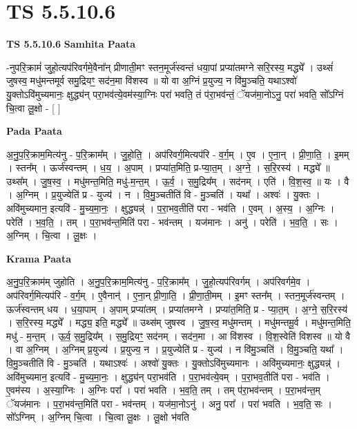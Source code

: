 \documentclass[17pt]{extarticle}
\begin{document}
\section{ TS 5.5.10.6 }

\textbf{TS 5.5.10.6 } \newline
\textbf{Samhita Paata} \newline

-नुपरि॒क्रामं॑ जुहो॒त्यप॑रिवर्गमे॒वैना᳚न् प्रीणाती॒मꣳ स्तन॒मूर्ज॑स्वन्तं धया॒पां प्रप्या॑तमग्ने सरि॒रस्य॒ मद्ध्ये᳚ । उथ्सं॑ जुषस्व॒ मधु॑मन्तमूर्व समु॒द्रियꣳ॒॒ सद॑न॒मा वि॑शस्व ॥ यो वा अ॒ग्निं प्र॒युज्य॒ न वि॑मु॒ञ्चति॒ यथाऽश्वो॑ यु॒क्तोऽवि॑मुच्यमानः॒ क्षुद्ध्य॑न् परा॒भव॑त्ये॒वम॑स्या॒ग्निः परा॑ भवति॒ तं प॑रा॒भव॑न्तं॒ ॅयज॑मा॒नोऽनु॒ परा॑ भवति॒ सो᳚ऽग्निं चि॒त्वा लू॒क्षो - [  ] \newline

\textbf{Pada Paata} \newline

अ॒नु॒प॒रि॒क्राम॒मित्य॑नु - प॒रि॒क्राम᳚म् । जु॒हो॒ति॒ । अप॑रिवर्ग॒मित्यप॑रि - व॒र्ग॒म् । ए॒व । ए॒ना॒न् । प्री॒णा॒ति॒ । इ॒मम् । स्तन᳚म् । ऊर्ज॑स्वन्तम् । ध॒य॒ । अ॒पाम् । प्रप्या॑त॒मिति॒ प्र-प्या॒त॒म् । अ॒ग्ने॒ । स॒रि॒रस्य॑ । मद्ध्ये᳚ ॥ उथ्स᳚म् । जु॒ष॒स्व॒ । मधु॑मन्त॒मिति॒ मधु॑-म॒न्त॒म् । ऊ॒र्व॒ । स॒मु॒द्रिय᳚म् । सद॑नम् । एति॑ । वि॒श॒स्व॒ ॥ यः । वै । अ॒ग्निम् । प्र॒युज्येति॑ प्र - युज्य॑ । न । वि॒मु॒ञ्चतीति॑ वि - मु॒ञ्चति॑ । यथा᳚ । अश्वः॑ । यु॒क्तः । अवि॑मुच्यमान॒ इत्यवि॑ - मु॒च्य॒मा॒नः॒ । क्षुद्ध्यन्न्॑ । प॒रा॒भव॒तीति॑ परा - भव॑ति । ए॒वम् । अ॒स्य॒ । अ॒ग्निः । परेति॑ । भ॒व॒ति॒ । तम् । प॒रा॒भव॑न्त॒मिति॑ परा - भव॑न्तम् । यज॑मानः । अनु॑ । परेति॑ । भ॒व॒ति॒ । सः । अ॒ग्निम् । चि॒त्वा । लू॒क्षः ।  \newline


\textbf{Krama Paata} \newline

अ॒नु॒प॒रि॒क्राम॑म् जुहोति । अ॒नु॒प॒रि॒क्राम॒मित्य॑नु - प॒रि॒क्राम᳚म् । जु॒हो॒त्यप॑रिवर्गम् । अप॑रिवर्गमे॒व । अप॑रिवर्ग॒मित्यप॑रि - व॒र्ग॒म् । ए॒वैनान्॑ । ए॒ना॒न् प्री॒णा॒ति॒ । प्री॒णा॒ती॒मम् । इ॒मꣳ स्तन᳚म् । स्तन॒मूर्ज॑स्वन्तम् । ऊर्ज॑स्वन्तम् धय । ध॒या॒पाम् । अ॒पाम् प्रप्या॑तम् । प्रप्या॑तमग्ने । प्रप्या॑त॒मिति॒ प्र - प्या॒त॒म् । अ॒ग्ने॒ स॒रि॒रस्य॑ । स॒रि॒रस्य॒ मद्ध्ये᳚ । मद्ध्य॒ इति॒ मद्ध्ये᳚ ॥ उथ्स॑म् जुषस्व । जु॒ष॒स्व॒ मधु॑मन्तम् । मधु॑मन्तमू॒र्व । मधु॑मन्त॒मिति॒ मधु॑ - म॒न्त॒म् । ऊ॒र्व॒ स॒मु॒द्रिय᳚म् । स॒मु॒द्रियꣳ॒॒ सद॑नम् । सद॑न॒मा । आ वि॑शस्व । वि॒श॒स्वेति॑ विशस्व ॥ यो वै । वा अ॒ग्निम् । अ॒ग्निम् प्र॒युज्य॑ । प्र॒युज्य॒ न । प्र॒युज्येति॑ प्र - युज्य॑ । न वि॑मु॒ञ्चति॑ । वि॒मु॒ञ्चति॒ यथा᳚ । वि॒मु॒ञ्चतीति॑ वि - मु॒ञ्चति॑ । यथाऽश्वः॑ । अश्वो॑ यु॒क्तः । यु॒क्तोऽवि॑मुच्यमानः । अवि॑मुच्यमानः॒ क्षुद्ध्यन्न्॑ । अवि॑मुच्यमान॒ इत्यवि॑ - मु॒च्य॒मा॒नः॒ । क्षुद्ध्य॑न् परा॒भव॑ति । प॒रा॒भव॑त्ये॒वम् । प॒रा॒भव॒तीति॑ परा - भव॑ति । ए॒वम॑स्य । अ॒स्या॒ग्निः । अ॒ग्निः परा᳚ । परा॑ भवति । भ॒व॒ति॒ तम् । तम् प॑रा॒भव॑न्तम् । प॒रा॒भव॑न्त॒म् ॅयज॑मानः । प॒रा॒भव॑न्त॒मिति॑ परा - भव॑न्तम् । यज॑मा॒नोऽनु॑ । अनु॒ परा᳚ । परा॑ भवति । भ॒व॒ति॒ सः । सो᳚ऽग्निम् । अ॒ग्निम् चि॒त्वा । चि॒त्वा लू॒क्षः । लू॒क्षो भ॑वति \newline
\end{document}
